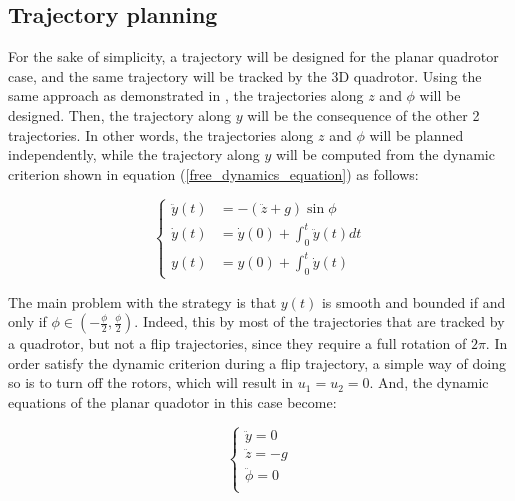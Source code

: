 \documentclass{thesisreport}
\begin{document}
\subsection{Trajectory planning}


For the sake of simplicity, a trajectory will be designed for the planar quadrotor case, and the same trajectory will be tracked by the 3D quadrotor. 
Using the same approach as demonstrated in \cite{Orsingher2019}, the trajectories along $z$ and $\phi$ will be designed. Then, the trajectory along $y$ will be the consequence of the other 2 trajectories. In other words, the trajectories along $z$ and $\phi$ will be planned independently, while the trajectory along $y$ will be computed from the dynamic criterion shown in equation (\ref{free_dynamics_equation}) as follows: 

\begin{equation}\label{double_integration_of_ydd}
\begin{cases}
	\ddot{y}(t) &= - (\ddot{z} + g) \sin \phi \\
	\dot{y}(t)  &= \dot{y}(0) + \int_0^t \ddot{y}(t) dt \\
	y(t) &= y(0) + \int_0^t \dot{y}(t) 
\end{cases}
\end{equation}

\newpage

The main problem with the strategy is that $y(t)$ is smooth and bounded if and only if $\phi \in (-\frac{\phi}{2}, \frac{\phi}{2})$. Indeed, this by most of the trajectories that are tracked by a quadrotor, but not a flip trajectories, since they require a full rotation of $2 \pi$. In order satisfy the dynamic criterion during a flip trajectory, a simple way of doing so is to turn off the rotors, which will result in $u_1=u_2=0$. And, the dynamic equations of the planar quadotor in this case become:

\begin{equation}\label{free_dynamics_planar_quadrotor}
 \begin{cases} 
       \ddot{y} = 0 \\
       \ddot{z} = - g  \\
       \ddot{\phi} = 0 \\
   \end{cases}
\end{equation}
\end{document}
